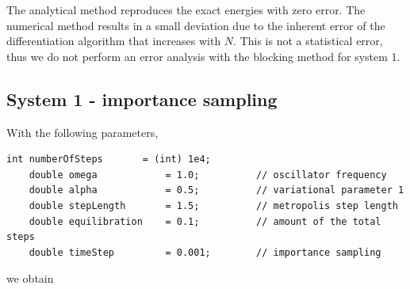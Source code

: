 \documentclass[english, a4paper]{article}
\begin{document}
\noindent The analytical method reproduces the exact energies with zero error. 
The numerical method results in a small deviation due to the inherent 
error of the differentiation algorithm that increases with $N$.
This is not a statistical error, thus we do not perform an error analysis with the blocking method
for system 1. 


\subsection{System 1 - importance sampling}

With the following parameters,
\belowcaptionskip=-10pt
\begin{lstlisting}[label=parameters2,caption=Parameters importance sampling Metropolis system 1]
    int numberOfSteps       = (int) 1e4;
    double omega            = 1.0;          // oscillator frequency
    double alpha            = 0.5;          // variational parameter 1
    double stepLength       = 1.5;          // metropolis step length
    double equilibration    = 0.1;          // amount of the total steps
    double timeStep         = 0.001;        // importance sampling
\end{lstlisting}
we obtain
\end{document}
